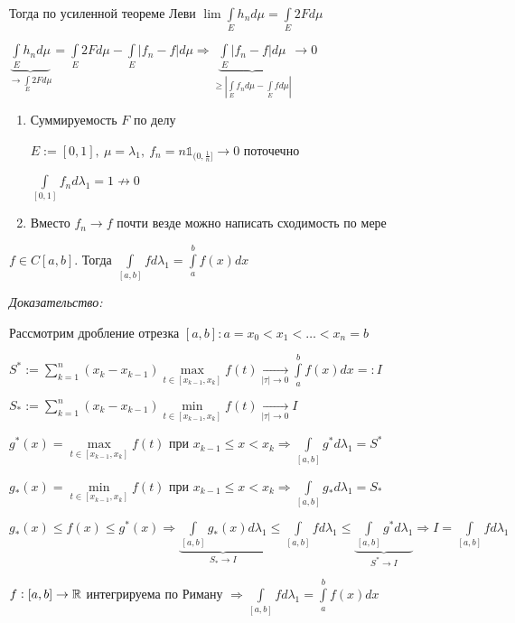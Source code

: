 \documentclass[12pt]{article}
\begin{document}
Тогда по усиленной теореме Леви $\lim \int\limits_E h_nd\mu = \int\limits_E 2Fd\mu$

$\underbrace{\int\limits_E h_nd\mu}_{\to \int\limits_E 2Fd\mu} = \int\limits_E 2Fd\mu - \int\limits_E |f_n - f|d\mu \Rightarrow \underbrace{\int\limits_E |f_n - f|d\mu}_{\geq |\int\limits_E f_nd\mu - \int\limits_E fd\mu|} \to 0$

\begin{Remark}{}
    \begin{enumerate}
        \item Суммируемость $F$ по делу
        
        $E := [0, 1],\ \mu = \lambda_1,\ f_n = n\mathbb{1}_{(0, \frac{1}{n}]} \to 0$ поточечно 

        $\int\limits_{[0, 1]} f_nd\lambda_1 = 1 \not\to 0$

        \item Вместо $f_n \to f$ почти везде можно написать сходимость по мере 
    \end{enumerate}
\end{Remark}

\begin{theo}{}
    $f \in C[a, b]$. Тогда $\int\limits_{[a, b]} fd\lambda_1 = \int\limits_a^b f(x)dx$
\end{theo}

\textit{Доказательство:}

Рассмотрим дробление отрезка $[a, b] : a = x_0 < x_1 < \ldots < x_n = b$

$S^* := \sum\limits_{k = 1}^n (x_k - x_{k - 1})\max\limits_{t \in [x_{k - 1}, x_k]} f(t) \xrightarrow[|\tau| \to 0]{} \int\limits_a^b f(x)dx =: I$

$S_* := \sum\limits_{k = 1}^n (x_k - x_{k - 1})\min\limits_{t \in [x_{k - 1}, x_k]} f(t) \xrightarrow[|\tau| \to 0]{} I$

$g^*(x) = \max\limits_{t \in [x_{k - 1}, x_k]} f(t)$ при $x_{k - 1} \leq x < x_k \Rightarrow \int\limits_{[a, b]} g^*d\lambda_1 = S^*$

$g_*(x) = \min\limits_{t \in [x_{k - 1}, x_k]} f(t)$ при $x_{k - 1} \leq x < x_k \Rightarrow \int\limits_{[a, b]} g_*d\lambda_1 = S_*$

$g_*(x) \leq f(x) \leq g^*(x) \Rightarrow \underbrace{\int\limits_{[a, b]} g_*(x) d\lambda_1}_{S_* \to I} \leq \int\limits_{[a, b]} fd\lambda_1 \leq \underbrace{\int\limits_{[a, b]} g^*d\lambda_1}_{S^* \to I} \Rightarrow I = \int\limits_{[a, b]}fd\lambda_1$

\begin{theo}{}
    $f : [a, b] \to \mathbb R$ интегрируема по Риману $\Rightarrow \int\limits_{[a, b]} fd\lambda_1 = \int\limits_a^b f(x)dx$
\end{theo}
\end{document}
